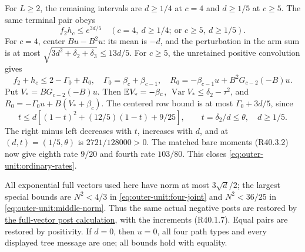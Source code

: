 For \(L\ge2\), the remaining intervals are \(d\ge1/4\) at \(c=4\)
and \(d\ge1/5\) at \(c\ge5\).
The same terminal pair obeys
\begin{equation}\label{eq:outer-unit:high-pair}
 f_2h_c\le e^{3d/5}
 \quad(c=4,\ d\ge1/4;\ \text{or }c\ge5,\ d\ge1/5).
\end{equation}
For \(c=4\), center \(Bu-B^2u\): its mean is \(-d\), and the
perturbation in the arm sum is at most
\(\sqrt{3d^2+\delta_2+\delta_3}\le13d/5\).
For \(c\ge5\), the unretained positive convolution gives
\begin{equation}\label{eq:outer-unit:unretained}
 f_2+h_c\le2-\Gamma_0+R_0,\quad
 \Gamma_0=\beta_c+\beta_{c-1},\quad
 R_0=-\beta_{c-1}u+B^2G_{c-2}(-B)u.
\end{equation}
Put \(V_*=BG_{c-2}(-B)u\). Then \(\mathbb E V_*=-\beta_c\),
\(\operatorname{Var}V_*\le\delta_2-\tau^2\), and
\(R_0=-\Gamma_0u+B(V_*+\beta_c)\).
The centered row bound is at most \(\Gamma_0+3d/5\), since
\[
 t\le d[(1-t)^2+(12/5)(1-t)+9/25],\qquad
 t=\delta_2/d\le\theta,\quad d\ge1/5.
\]
The right minus left decreases with \(t\), increases with \(d\), and
at \((d,t)=(1/5,\theta)\) is \(2721/128000>0\).
The matched bare moments (R40.3.2) now give eighth rate \(9/20\)
and fourth rate \(103/80\).
This closes \eqref{eq:outer-unit:ordinary-rates}.

All exponential full vectors used here have norm at most
\(3\sqrt d/2\); the largest special bounds are
\(N^2<4/3\) in \eqref{eq:outer-unit:four-joint} and
\(N^2<36/25\) in \eqref{eq:outer-unit:middle-norm}.
Thus the same actual negative posts are restored by
\hyperref[part:R40.12]{the full-vector post calculation}, with
the increments (R40.1.7). Equal pairs are restored by positivity.
If \(d=0\), then \(u=0\), all four path types and every displayed
tree message are one; all bounds hold with equality.


